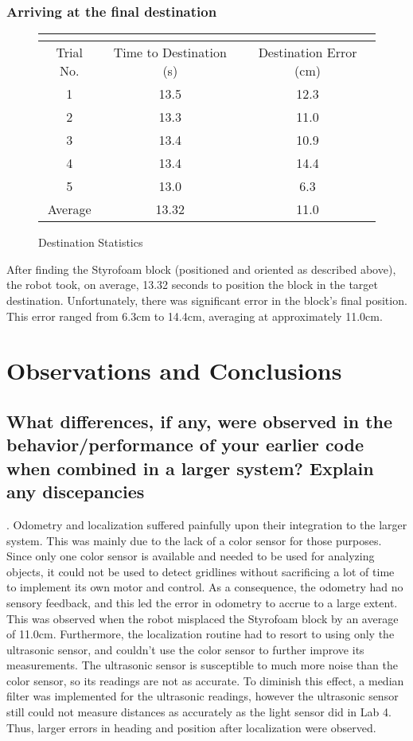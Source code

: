 \documentclass[10pt]{article}
\begin{document}
\subsubsection{Arriving at the final destination}
\begin{figure}[h!t]
\begin{center}
\caption{Destination Statistics}
\begin{tabular}{| c | c | c |}
\multicolumn{3}{c}{} \\ \hline
\rowcolor{dblue}
Trial No. & Time to Destination (s) & Destination Error (cm) \\ \hline
1 & 13.5 & 12.3 \\ \hline
2 & 13.3 & 11.0 \\ \hline
3 & 13.4 & 10.9 \\ \hline
4 & 13.4 & 14.4 \\ \hline
5 & 13.0 & 6.3 \\ \hline
\rowcolor{lred}
Average & 13.32 & 11.0 \\ \hline
\end{tabular}
\end{center}
\end{figure}
After finding the Styrofoam block (positioned and oriented as described above), the robot took, on
average, 13.32 seconds to position the block in the target destination. Unfortunately, there was
significant error in the block's final position. This error ranged from 6.3cm to 14.4cm, averaging
at approximately 11.0cm.

\section{Observations and Conclusions}
\subsection{What differences, if any, were observed in the behavior/performance of your earlier code
when combined in a larger system? Explain any discepancies}.
Odometry and localization suffered painfully upon their integration to the larger system. This was
mainly due to the lack of a color sensor for those purposes. Since only one color sensor is
available and needed to be used for analyzing objects, it could not be used to detect gridlines
without sacrificing a lot of time to implement its own motor and control. As a consequence, the
odometry had no sensory feedback, and this led the error in odometry to accrue to a large extent.
This was observed when the robot misplaced the Styrofoam block by an average of 11.0cm. Furthermore,
the localization routine had to resort to using only the ultrasonic sensor, and couldn't use the
color sensor to further improve its measurements. The ultrasonic sensor is susceptible to much more
noise than the color sensor, so its readings are not as accurate. To diminish this effect, a median
filter was implemented for the ultrasonic readings, however the ultrasonic sensor still could not
measure distances as accurately as the light sensor did in Lab 4. Thus, larger errors in heading and
position after localization were observed.
\end{document}
